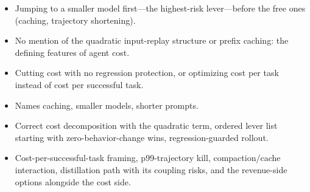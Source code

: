 \begin{interviewq}
\redflags
\begin{itemize}
    \item Jumping to a smaller model first---the highest-risk lever---before the free ones (caching, trajectory shortening).
    \item No mention of the quadratic input-replay structure or prefix caching: the defining features of agent cost.
    \item Cutting cost with no regression protection, or optimizing cost per task instead of cost per successful task.
\end{itemize}


\goodgreat
\begin{itemize}
    \item {} Names caching, smaller models, shorter prompts.
    \item {} Correct cost decomposition with the quadratic term, ordered lever list starting with zero-behavior-change wins, regression-guarded rollout.
    \item {} Cost-per-successful-task framing, p99-trajectory kill, compaction/cache interaction, distillation path with its coupling risks, and the revenue-side options alongside the cost side.
\end{itemize}

\end{interviewq}


